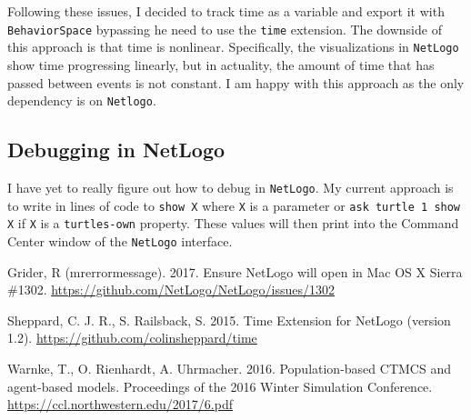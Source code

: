 \documentclass[11pt, oneside]{article}   	%
\begin{document}
Following these issues, I decided to track time as a variable and export it with \texttt{BehaviorSpace} bypassing he need to use the \texttt{time} extension. The downside of this approach is that time is nonlinear. Specifically, the visualizations in \texttt{NetLogo} show time progressing linearly, but in actuality, the amount of time that has passed between events is not constant. I am happy with this approach as the only dependency is on \texttt{Netlogo}.

\subsection{Debugging in NetLogo}
I have yet to really figure out how to debug in \texttt{NetLogo}. My current approach is to write in lines of code to \texttt{show X} where \texttt{X} is a parameter or \texttt{ask turtle 1 show X} if \texttt{X} is a \texttt{turtles-own} property. These values will then print into the Command Center window of the \texttt{NetLogo} interface.

\begin{thebibliography}{10}
 Grider, R (mrerrormessage). 2017. Ensure NetLogo will open in Mac OS X Sierra \#1302. \url{https://github.com/NetLogo/NetLogo/issues/1302}

 Sheppard, C. J. R., S. Railsback, S. 2015. Time Extension for NetLogo (version 1.2). \url{https://github.com/colinsheppard/time}

  Warnke, T., O. Rienhardt, A. Uhrmacher. 2016. Population-based CTMCS and agent-based models. Proceedings of the 2016 Winter Simulation Conference. \url{https://ccl.northwestern.edu/2017/6.pdf}
 
\end{thebibliography}
\end{document}
